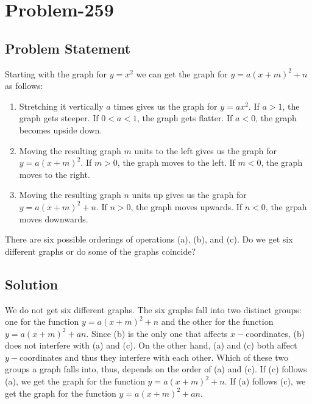 \documentclass[12pt]{article}
\begin{document}
\section*{Problem-259}
\subsection*{Problem Statement}
Starting with the graph for $y = x^2$ we can get the graph for $y = a(x+m)^2 + n$ as follows:
\begin{enumerate}[label=(\alph*)]
	\item Stretching it vertically $a$ times gives us the graph for $y = ax^2$. If $a > 1$, the graph gets steeper. If $0 < a < 1$, the graph gets flatter. If $a < 0$, the graph becomes upside down.
	\item Moving the resulting graph $m$ units to the left gives us the graph for $y = a(x+m)^2$. If $m > 0$, the graph moves to the left. If $m < 0$, the graph moves to the right.
	\item Moving the resulting graph $n$ units up gives us the graph for $y = a(x+m)^2 + n$. If $n > 0$, the graph moves upwards. If $n < 0$, the grpah moves downwards.
\end{enumerate}

There are six possible orderings of operations (a), (b), and (c). Do we get six different graphs or do some of the graphs coincide?

\subsection*{Solution}
We do not get six different graphs. The six graphs fall into two distinct groups: one for the function $y = a(x+m)^2+n$ and the other for the function $y = a(x+m)^2+an$. Since (b) is the only one that affects $x-$coordinates, (b) does not interfere with (a) and (c). On the other hand, (a) and (c) both affect $y-$coordinates and thus they interfere with each other. Which of these two groups a graph falls into, thus, depends on the order of (a) and (c). If (c) follows (a), we get the graph for the function $y = a(x+m)^2+n$. If (a) follows (c), we get the graph for the function $y = a(x+m)^2+an$.
\end{document}
